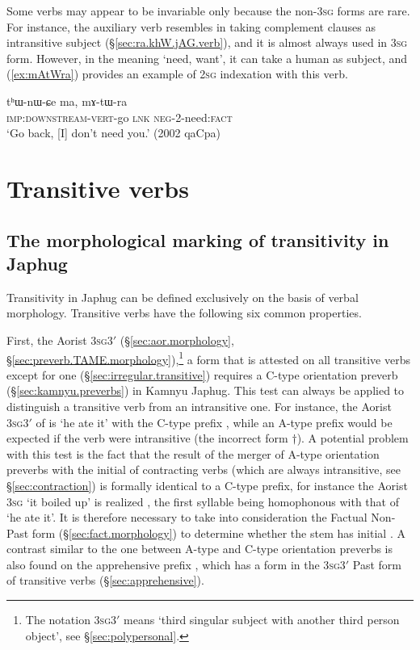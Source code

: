 Some verbs may appear to be invariable only because the non-\textsc{3sg} forms are rare. For instance, the auxiliary verb  resembles  in taking complement clauses as intransitive subject (§\ref{sec:ra.khW.jAG.verb}), and it is almost always used in \textsc{3sg} form. However, in the meaning `need, want', it can take a human as subject, and (\ref{ex:mAtWra}) provides an example of \textsc{2sg} indexation with this verb.

\begin{exe}
\ex   \label{ex:mAtWra}
\gll  tʰɯ-nɯ-ɕe ma, mɤ-tɯ-ra \\
\textsc{imp}:\textsc{downstream}-\textsc{vert}-go \textsc{lnk} \textsc{neg}-2-need:\textsc{fact} \\
\glt `Go back, [I] don't need you.' (2002 qaCpa)
\end{exe}

\section{Transitive verbs} \label{sec:tr.indexation}

\subsection{The morphological marking of transitivity in Japhug} \label{sec:transitivity.morphology}
Transitivity in Japhug can be defined exclusively on the basis of verbal morphology. Transitive verbs have the following six common properties.

First, the Aorist 3\textsc{sg}\fl{}3$'$ (§\ref{sec:aor.morphology}, §\ref{sec:preverb.TAME.morphology}),\footnote{The notation 3\textsc{sg}\fl{}3$'$ means `third singular subject with another third person object', see §\ref{sec:polypersonal}. } a form that is attested on all transitive verbs except for one (§\ref{sec:irregular.transitive}) requires a C-type orientation preverb (§\ref{sec:kamnyu.preverbs}) in Kamnyu Japhug. This test can always be applied to distinguish a transitive verb from an intransitive one. For instance, the Aorist 3\textsc{sg}\fl{}3$'$ of  is  `he ate it' with the C-type prefix , while an A-type prefix  would be expected if the verb were intransitive (the incorrect form $\dagger$). A potential problem with this test is the fact that the result of the merger of A-type orientation preverbs with the initial  of contracting verbs (which are always intransitive, see §\ref{sec:contraction}) is formally identical to a C-type prefix, for instance the Aorist \textsc{3sg}  `it boiled up' is realized , the first syllable  being homophonous with that of  `he ate it'. It is therefore necessary to take into consideration the Factual Non-Past form (§\ref{sec:fact.morphology}) to determine whether the stem has initial . A contrast similar to the one between A-type and C-type orientation preverbs is also found on the apprehensive prefix , which has a form  in the 3\textsc{sg}\fl{}3$'$ Past form of transitive verbs (§\ref{sec:apprehensive}).

